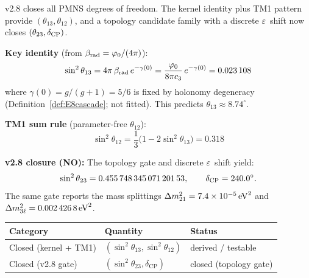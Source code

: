 \begin{tcolorbox}[colback=green!3, colframe=green!50!black, breakable,
    title={\textbf{PMNS full closure (v2.8): $\theta_{23}$ and $\delta_{\rm CP}$}}, fonttitle=\bfseries]
v2.8 closes all PMNS degrees of freedom. The kernel identity plus TM1 pattern provide
$(\theta_{13},\theta_{12})$, and a topology candidate family with a discrete
$\varepsilon$~shift now closes $(\theta_{23},\delta_{\rm CP})$.

\textbf{Key identity} (from $\beta_{\text{rad}} = \phiz/(4\pi)$):
\begin{equation}
    \sin^2\theta_{13} = 4\pi\,\beta_{\text{rad}}\, e^{-\gamma(0)} 
    = \frac{\phiz}{8\pi\cthree}\, e^{-\gamma(0)} = \num[round-mode=places,round-precision=6]{\TFPTsinSqThetaThirteen}
\end{equation}
where $\gamma(0)=g/(g+1)=5/6$ is fixed by holonomy degeneracy (Definition~\ref{def:E8cascade}; not fitted). 
This predicts $\theta_{13} \approx 8.74^\circ$.

\textbf{TM1 sum rule} (parameter-free $\theta_{12}$):
\begin{equation}
    \sin^2\theta_{12} = \frac{1}{3}\bigl(1 - 2\sin^2\theta_{13}\bigr) = 0.318
\end{equation}

\textbf{v2.8 closure (NO):} The topology gate and discrete $\varepsilon$~shift yield:
\[
\sin^2\theta_{23}=\num{\TFPTsinSqThetaTwentyThree},\qquad
\delta_{\rm CP}=\num{\TFPTPMNSdeltaCPDeg}^\circ.
\]
The same gate reports the mass splittings
$\Delta m^2_{21}=\num{\TFPTdeltaMtwoTwentyOne}\,\mathrm{eV}^2$ and
$\Delta m^2_{3\ell}=\num{\TFPTdeltaMtwoThreeL}\,\mathrm{eV}^2$.

\medskip
\begin{center}
\begin{tabular}{@{}lll@{}}
\toprule
\textbf{Category} & \textbf{Quantity} & \textbf{Status}\\
\midrule
Closed (kernel + TM1) & $(\sin^2\theta_{13},\sin^2\theta_{12})$ & derived / testable\\
Closed (v2.8 gate) & $(\sin^2\theta_{23},\delta_{\mathrm{CP}})$ & closed (topology gate)\\
\bottomrule
\end{tabular}
\end{center}


\end{tcolorbox}
